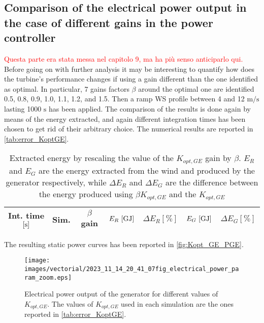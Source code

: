 \subsection{Comparison of the electrical power output in the case of different gains in the power controller}\label{subsec:c_different_KoptGE}
\textcolor{red}{Questa parte era stata messa nel capitolo 9, ma ha più senso anticiparlo qui.}
Before going on with further analysis it may be interesting to quantify how does the turbine's performance changes if using a gain different than the one identified as optimal. In particular, 7 gains factors $\beta$ around the optimal one are identified 0.5, 0.8, 0.9, 1.0, 1.1, 1.2, and 1.5. Then a ramp WS profile between 4 and 12 $\si{\meter\per\second}$ lasting 1000 $\si{\second}$ has been applied. The comparison of the results is done again by means of the energy extracted, and again different integration times has been chosen to get rid of their arbitrary choice. The numerical results are reported in \autoref{tab:error_KoptGE}. 

\begin{table}[htb]
  \caption{Extracted energy by rescaling the value of the $K_{opt,GE}$ gain by $\beta$. $E_R$ and $E_G$ are the energy extracted from the wind and produced by the generator respectively, while $\Delta E_R$ and $\Delta E_G$ are the difference between the energy produced using $\beta K_{opt,GE}$ and the $K_{opt,GE}$}
  \centering
  \begin{tabular}{ccccccc}
  \toprule
  Int. time $\left[\si{\second}\right]$ & Sim. & $\beta$ gain & $E_R \, \left[\si{\giga\joule}\right]$ & $\Delta E_R \left[\%\right]$ & $E_G \, \left[\si{\giga\joule}\right]$ & $\Delta E_G \left[\%\right]$\\ 
   \midrule
  
  \end{tabular}
  \label{tab:error_KoptGE}
\end{table}

The resulting static power curves has been reported in \autoref{fig:Kopt_GE_PGE}.
\begin{figure}
  \centering
  \texttt{[image: images/vectorial/2023\_11\_14\_20\_41\_07fig\_electrical\_power\_param\_zoom.eps]}
  \caption{Electrical power output of the generator for different values of $K_{opt,GE}$. The values of $K_{opt,GE}$ used in each simulation are the ones reported in \autoref{tab:error_KoptGE}.}
  \label{fig:Kopt_GE_PGE}
\end{figure}


